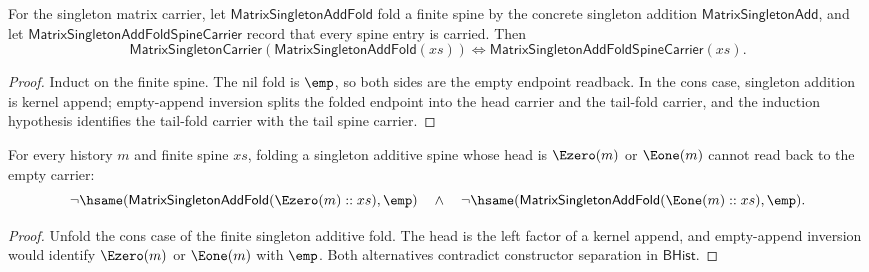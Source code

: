 \begin{theorem}
\label{thm:matrix-singleton-add-fold-carrier-iff}
For the singleton matrix carrier, let
\(\mathsf{MatrixSingletonAddFold}\) fold a finite spine by the concrete
singleton addition \(\mathsf{MatrixSingletonAdd}\), and let
\(\mathsf{MatrixSingletonAddFoldSpineCarrier}\) record that every spine entry
is carried. Then
$$
\mathsf{MatrixSingletonCarrier}(\mathsf{MatrixSingletonAddFold}(xs))
\Longleftrightarrow
\mathsf{MatrixSingletonAddFoldSpineCarrier}(xs).
$$
\end{theorem}
\begin{proof}
Induct on the finite spine. The nil fold is \(\emp\), so both sides are the
empty endpoint readback. In the cons case, singleton addition is kernel
append; empty-append inversion splits the folded endpoint into the head
carrier and the tail-fold carrier, and the induction hypothesis identifies the
tail-fold carrier with the tail spine carrier.
\end{proof}

\begin{theorem}
\label{thm:matrix-singleton-add-fold-visible-head-absurd}
For every history $m$ and finite spine $xs$, folding a singleton additive spine
whose head is $\Ezero(m)$ or $\Eone(m)$ cannot read back to the empty carrier:
$$
\neg\hsame(\mathsf{MatrixSingletonAddFold}(\Ezero(m)::xs),\emp)
\quad\wedge\quad
\neg\hsame(\mathsf{MatrixSingletonAddFold}(\Eone(m)::xs),\emp).
$$
\end{theorem}
\begin{proof}
Unfold the cons case of the finite singleton additive fold. The head is the
left factor of a kernel append, and empty-append inversion would identify
$\Ezero(m)$ or $\Eone(m)$ with $\emp$. Both alternatives contradict constructor
separation in $\mathsf{BHist}$.
\end{proof}

